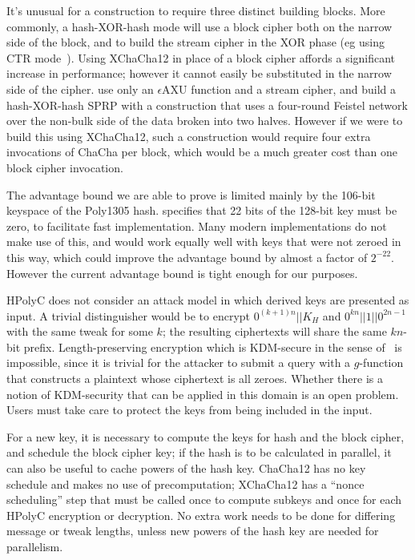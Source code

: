 \documentclass[letterpaper,luatex,11pt]{article}
\begin{document}
It's unusual for a construction to require three distinct building blocks.
More commonly, a hash-XOR-hash mode will use a block cipher both on the narrow side of the
block, and to build the stream cipher in the XOR phase (eg using CTR mode~\cite{ctr}).
Using XChaCha12 in place of a block cipher affords a significant increase in performance;
however it cannot easily be substituted in the narrow side of the cipher.
\cite{sarkar1,sarkar2,sarkar3,sarkar4} use only an $\epsilon$AXU function
and a stream cipher, and build a hash-XOR-hash SPRP
with a construction that uses a four-round Feistel network over the non-bulk side of the data
broken into two halves. However if we were to build this using XChaCha12,
such a construction would require four extra invocations of ChaCha per block, which would be
a much greater cost than one block cipher invocation.

The advantage bound we are able to prove is limited mainly by the 106-bit keyspace of
the Poly1305 hash. \cite{poly1305} specifies that 22 bits of the 128-bit key must be zero,
to facilitate fast implementation. Many modern implementations do not
make use of this, and would work equally well with keys that were not zeroed in this way, which
could improve the advantage bound by almost a factor of $2^{-22}$. However the current advantage
bound is tight enough for our purposes.

HPolyC does not consider an attack model in which derived keys are presented as input.
A trivial distinguisher would be to encrypt $0^{(k+1)n}||K_H$ and $0^{kn}||1||0^{2n-1}$
with the same tweak for some $k$; the resulting ciphertexts will share the same
$kn$-bit prefix. Length-preserving encryption
which is KDM-secure in the sense of~\cite{kdm} is impossible, since it is trivial for the
attacker to submit a query with a $g$-function
that constructs a plaintext whose ciphertext is all zeroes.
Whether there is a notion of KDM-security that can be
applied in this domain is an open problem. Users must take care to protect the keys from being
included in the input.

For a new key, it is necessary to compute the keys for hash and the block cipher, and
schedule the block cipher key; if the hash is to be calculated in parallel, it can also
be useful to cache powers of the hash key.
ChaCha12 has no key schedule and makes no use of
precomputation; XChaCha12 has a ``nonce scheduling'' step that
must be called once to compute subkeys and once for each HPolyC encryption or decryption.
No extra work needs to be done for differing message or tweak lengths, unless
new powers of the hash key are needed for parallelism.
\end{document}
